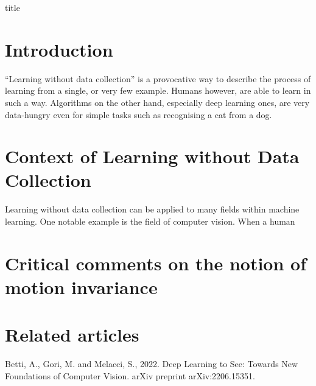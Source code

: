 \documentclass[12pt]{article}
\begin{document}
{title}

\tableofcontents



 



\section{Introduction}
``Learning without data collection'' is a provocative way to describe the process of learning from a single, or very few example. Humans however, are able to learn in such a way. Algorithms on the other hand, especially deep learning ones, are very data-hungry even for simple tasks such as recognising a cat from a dog.

\section{Context of Learning without Data Collection}
Learning without data collection can be applied to many fields within machine learning. One notable example is the field of computer vision. When a human 


\section{Critical comments on the notion of motion invariance}
\section{Related articles}

\begin{thebibliography}{99}
   Betti, A., Gori, M. and Melacci, S., 2022. Deep Learning to See: Towards New Foundations of Computer Vision. arXiv preprint arXiv:2206.15351.  
\end{thebibliography}
\end{document}
